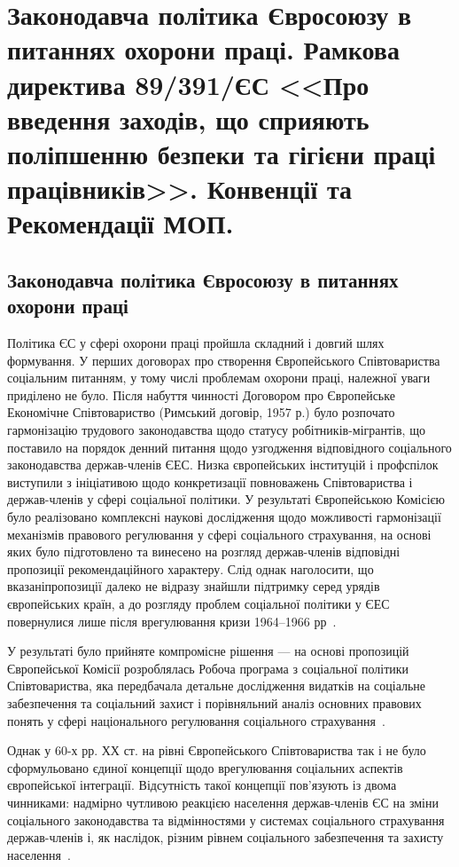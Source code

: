 


\Ukrainian

\section*{Законодавча політика Євросоюзу в питаннях охорони праці. Рамкова директива 89/391/ЄС <<Про введення заходів, що сприяють поліпшенню безпеки та гігієни праці працівників>>. Конвенції та Рекомендації МОП.}

\subsection*{Законодавча політика Євросоюзу в питаннях охорони праці}
Політика ЄС у сфері охорони праці пройшла складний і довгий шлях формування.
У перших договорах про створення Європейського Співтовариства соціальним питанням, у тому числі проблемам охорони праці, належної уваги приділено не було. 
Після набуття чинності Договором про Європейське Економічне Співтовариство (Римський договір, 1957 р.) було розпочато гармонізацію трудового законодавства щодо статусу робітників-мігрантів, що поставило на порядок денний питання щодо узгодження відповідного соціального законодавства держав-членів ЄЕС. 
Низка європейських інституцій і профспілок виступили з ініціативою щодо конкретизації повноважень Співтовариства і держав-членів у сфері соціальної політики. У результаті Європейською Комісією було реалізовано комплексні наукові дослідження щодо можливості гармонізації механізмів правового регулювання у сфері соціального страхування, на основі яких було підготовлено та винесено на розгляд держав-членів відповідні пропозиції рекомендаційного характеру. 
Слід однак наголосити, що вказаніпропозиції далеко не відразу знайшли підтримку серед урядів європейських країн, а до розгляду проблем соціальної політики у ЄЕС повернулися лише після врегулювання кризи 1964–1966 рр~\cite{Shashula2015}.

У результаті було прийняте компромісне рішення --- на основі пропозицій Європейської Комісії розроблялась Робоча програма з соціальної політики  Співтовариства, яка передбачала детальне дослідження видатків на соціальне забезпечення та соціальний захист і порівняльний аналіз основних правових понять у сфері національного регулювання соціального страхування~\cite{Shashula2015}.

Однак у 60-х рр. ХХ ст. на рівні Європейського Співтовариства так і не було сформульовано єдиної концепції щодо врегулювання соціальних аспектів європейської інтеграції. Відсутність такої концепції пов’язують із двома чинниками: надмірно чутливою реакцією населення держав-членів ЄС на зміни соціального законодавства та відмінностями у системах соціального страхування держав-членів і, як наслідок, різним рівнем соціального забезпечення та захисту населення~\cite{Shashula2015}.

